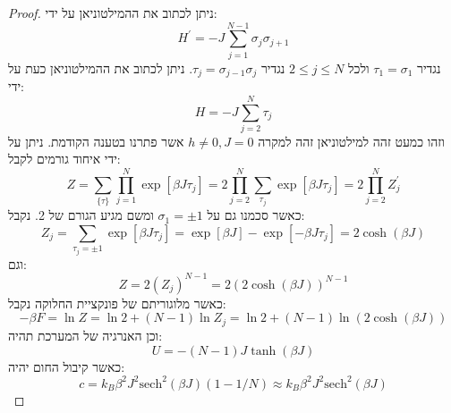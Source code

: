 \documentclass{tstextbook}
\begin{document}
\begin{proposition}[שרשרת איזינג עם \(h=0\)]
\end{proposition}
\begin{proof}
ניתן לכתוב את ההמילטוניאן על ידי:
$$H^{\prime}=-J\sum_{j=1}^{N-1}\sigma_{j}\sigma_{j+1}$$
נגדיר \(\tau_{1}=\sigma_{1}\) ולכל \(2\leq j\leq N\) נגדיר \(\tau_{j}=\sigma_{j-1}\sigma_{j}\). ניתן לכתוב את ההמילטוניאן כעת על ידי:
$$H=-J\sum_{j=2}^{N}\tau_{j}$$
וזהו כמעט זהה למילטוניאן זהה למקרה \(h\neq 0,J=0\) אשר פתרנו בטענה הקודמת. ניתן על ידי איחוד גורמים לקבל:
$$Z=\sum_{\{\tau\}}\prod_{j=1}^{N}\exp[\beta J\tau_{j}]=2\prod_{j=2}^{N}\sum_{\tau_{j}}\exp[\beta J\tau_{j}]=2\prod_{j=2}^{N}Z_{j}^{\prime}$$
כאשר סכמנו גם על \(\sigma_{1}=\pm 1\) ומשם מגיע הגורם של 2. נקבל:
$$Z_{j}=\sum_{\tau_{j}=\pm1}\exp[\beta J\tau_{j}]=\exp[\beta J]-\exp[-\beta J\tau_{j}]=2\cosh(\beta J)$$
וגם:
$$Z=2(Z_{j})^{N-1}=2\left(2\cosh(\beta J)\right)^{N-1}$$
כאשר מלוגוריתם של פונקציית החלוקה נקבל:
$$-\beta F=\ln Z=\ln2+(N-1)\ln Z_{j}=\ln2+(N-1)\ln\left(2\cosh(\beta J)\right)$$
וכן האנרגיה של המערכת תהיה:
$$U=-(N-1)J\operatorname{tanh}(\beta J)$$
כאשר קיבול החום יהיה:
$$c=k_{B}\beta^{2}J^{2}\mathrm{sech}^{2}(\beta J)\left(1-1/N\right)\approx k_{B}\beta^{2}J^{2}\mathrm{sech}^{2}(\beta J)$$

\end{proof}
\end{document}

